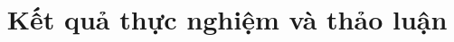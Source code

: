 \documentclass[conference]{IEEEtran}
\begin{document}
\title{Kết quả thực nghiệm và thảo luận}
\author{}
\maketitle


\end{document}
